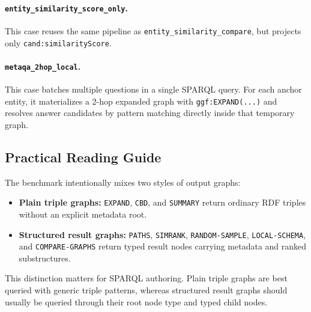 \paragraph{\texttt{entity\_similarity\_score\_only}.}
This case reuses the same pipeline as
\texttt{entity\_similarity\_compare}, but projects only
\texttt{cand:similarityScore}.

\paragraph{\texttt{metaqa\_2hop\_local}.}
This case batches multiple questions in a single SPARQL query. For each anchor
entity, it materializes a 2-hop expanded graph with \texttt{ggf:EXPAND(...)}
and resolves answer candidates by pattern matching directly inside that
temporary graph.

\subsection{Practical Reading Guide}
\label{subsec:ggf-reading-guide}

The benchmark intentionally mixes two styles of output graphs:
\begin{itemize}
\item \textbf{Plain triple graphs:} \texttt{EXPAND}, \texttt{CBD}, and
\texttt{SUMMARY} return ordinary RDF triples without an explicit metadata root.
\item \textbf{Structured result graphs:} \texttt{PATHS}, \texttt{SIMRANK},
\texttt{RANDOM-SAMPLE}, \texttt{LOCAL-SCHEMA}, and
\texttt{COMPARE-GRAPHS} return typed result nodes carrying metadata and
ranked substructures.
\end{itemize}

This distinction matters for SPARQL authoring. Plain triple graphs are best
queried with generic triple patterns, whereas structured result graphs should
usually be queried through their root node type and typed child nodes.
